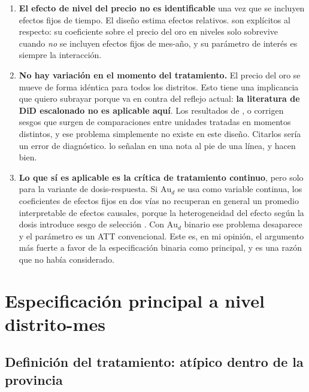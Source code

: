 \documentclass[11pt,a4paper]{article}
\newcommand{\Au}{\mathrm{Au}}
\begin{document}
\begin{enumerate}[leftmargin=1.6em,itemsep=3pt]
\item \textbf{El efecto de nivel del precio no es identificable} una vez que se incluyen efectos fijos de tiempo. El diseño estima efectos relativos. \citet{braakmann2024} son explícitos al respecto: su coeficiente sobre el precio del oro en niveles solo sobrevive cuando \emph{no} se incluyen efectos fijos de mes-año, y su parámetro de interés es siempre la interacción.

\item \textbf{No hay variación en el momento del tratamiento.} El precio del oro se mueve de forma idéntica para todos los distritos. Esto tiene una implicancia que quiero subrayar porque va en contra del reflejo actual: \textbf{la literatura de DiD escalonado no es aplicable aquí}. Los resultados de \citet{callaway2021}, \citet{sunabraham2021} o \citet{dechaisemartin2020} corrigen sesgos que surgen de comparaciones entre unidades tratadas en momentos distintos, y ese problema simplemente no existe en este diseño. Citarlos sería un error de diagnóstico. \citet{braakmann2024} lo señalan en una nota al pie de una línea, y hacen bien.

\item \textbf{Lo que sí es aplicable es la crítica de tratamiento continuo}, pero solo para la variante de dosis-respuesta. Si $\Au_d$ se usa como variable continua, los coeficientes de efectos fijos en dos vías no recuperan en general un promedio interpretable de efectos causales, porque la heterogeneidad del efecto según la dosis introduce sesgo de selección \citep{callaway2024}. Con $\Au_d$ binario ese problema desaparece y el parámetro es un ATT convencional. Este es, en mi opinión, el argumento más fuerte a favor de la especificación binaria como principal, y es una razón que no había considerado.
\end{enumerate}

\section{Especificación principal a nivel distrito-mes}\label{sec:principal}

\subsection{Definición del tratamiento: atípico dentro de la provincia}
\end{document}
